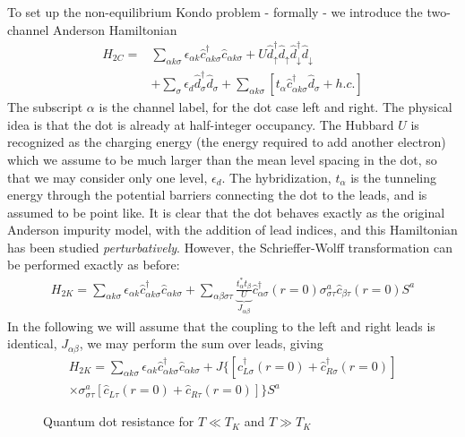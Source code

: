 \documentclass[11pt]{report}
\begin{document}
To set up the non-equilibrium Kondo problem - formally - we introduce the two-channel Anderson Hamiltonian
\begin{align}
  H_{2C}=&\sum_{\alpha k\sigma}\epsilon_{\alpha k}\hat{c}^{\dagger}_{\alpha k\sigma}\hat{c}_{\alpha
  k\sigma}+U\hat{d}^{\dagger}_{\uparrow}\hat{d}_{\uparrow}\hat{d}^{\dagger}_{\downarrow}\hat{d}_{\downarrow}\nonumber\\
  &+\sum_{\sigma}\epsilon_{d}\hat{d}^{\dagger}_{\sigma}\hat{d}_{\sigma}+\sum_{\alpha
  k\sigma}[t_{\alpha}\hat{c}^{\dagger}_{\alpha k\sigma}\hat{d}_{\sigma}+h.c.]
\end{align}
The subscript $\alpha$ is the channel label, for the dot case left and right.  The physical idea is that the dot is already at half-integer occupancy.  The Hubbard $U$ is recognized as the charging energy (the energy required to add another electron) which we assume to be much larger than the mean level spacing in the dot, so that we may consider only one level, $\epsilon_{d}$.  The hybridization, $t_{\alpha}$ is the tunneling energy through the potential barriers connecting the dot to the leads, and is assumed to be point like.  It is clear that the dot behaves exactly as the original Anderson impurity model, with the addition of lead indices, and this Hamiltonian has been studied \emph{perturbatively}.  However, the Schrieffer-Wolff transformation can be performed exactly as before:
\begin{align}
  H_{2K}=\sum_{\alpha k\sigma}\epsilon_{\alpha k}\hat{c}^{\dagger}_{\alpha k\sigma}\hat{c}_{\alpha
  k\sigma}+\sum_{\alpha\beta\sigma\tau}\underbrace{\frac{t^{*}_{\alpha}t_{\beta}}{U}}_{J_{\alpha\beta}}\hat{c}^{\dagger}_{\alpha\sigma}(r=0)\sigma^{a}_{\sigma\tau}\hat{c}_{\beta\tau}(r=0)S^{a}
\end{align}
In the following we will assume that the coupling to the left and right leads is identical, $J_{\alpha\beta}$,  we may perform the sum over leads, giving
\begin{align}\label{2lead}
  H_{2K}=\sum_{\alpha k\sigma}\epsilon_{\alpha k}\hat{c}^{\dagger}_{\alpha k\sigma}\hat{c}_{\alpha
  k\sigma}+J\{[\hat{c}_{L\sigma}^{\dagger}(r=0)+\hat{c}_{R\sigma}^{\dagger}(r=0)]\nonumber\\
  \times\sigma^{a}_{\sigma\tau}[\hat{c}_{L\tau}(r=0)+\hat{c}_{R\tau}(r=0)]\}S^{a}
\end{align}

\begin{figure}
\caption{Quantum dot resistance for $T\ll T_{K}$ and $T\gg T_{K}$
}\label{kondodotresistance}
\end{figure}
\end{document}
